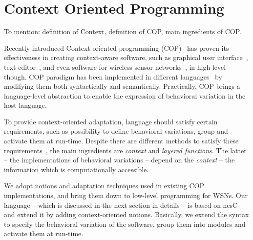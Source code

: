 \section{Context Oriented Programming}
To mention: definition of Context, definition of COP, main ingredients of COP.

Recently introduced Context-oriented programming (COP)~\cite{Hirschfeld08} has
proven its effectiveness in creating context-aware software, such as graphical
user interface~\cite{Keays03}, text editor~\cite{Kamina11}, and even software for wireless
sensor networks~\cite{Sehic11}, in high-level though. COP paradigm has been
implemented in different languages~\cite{Salvaneschi12} by modifying them both
syntactically and semantically. Practically, COP brings a language-level abstraction 
to enable the expression of behavioral variation in the host language.

To provide context-oriented adaptation, language should satisfy certain requirements, such as
possibility to define behavioral variations, group and activate them at
run-time. Despite there are different methods to satisfy these
requirements~\cite{Salvaneschi12}, the main ingredients are \emph{context} and
\emph{layered functions}. The latter -- the implementations of behavioral
variations -- depend on the \emph{context} -- the information which is
computationally accessible.

We adopt notions and adaptation techniques used in existing COP implementations,
and bring them down to low-level programming for WSNs. Our language \conesc --
which is discussed in the next section in details -- is based on nesC and extend
it by adding context-oriented notions. Basically, we extend the syntax to
specify the behavioral variation of the software, group them into modules and
activate them at run-time.
